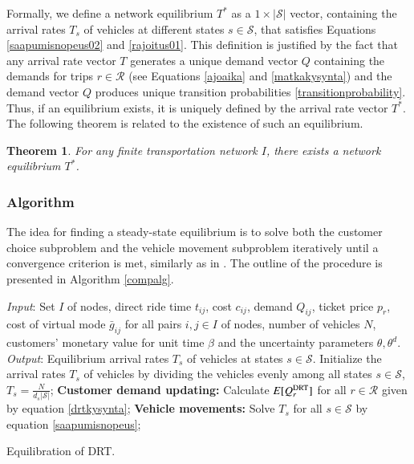 \documentclass[dissertation,draft*]{aaltoseries}
\newtheorem{theorem}{Theorem}
\begin{document}
Formally, we define a network equilibrium $T^*$ as a $1 \times |\mathcal{S}|$ vector, containing the 
arrival rates $T_s$ of vehicles at different states $s \in \mathcal{S}$, that satisfies Equations 
\eqref{saapumisnopeus02} and \eqref{rajoitus01}. This definition is justified by the fact that 
any arrival rate vector $T$ generates a unique demand vector $Q$ containing the demands for trips $r \in \mathcal{R}$ 
(see Equations \eqref{ajoaika} and \eqref{matkakysynta}) and the demand vector
$Q$ produces unique transition probabilities \eqref{transitionprobability}.
Thus, if an equilibrium exists, it is uniquely defined by the arrival rate vector $T^*$.
The following theorem is related to the existence of such an equilibrium.

\begin{theorem}
For any finite transportation network $I$, there exists a network equilibrium $T^*$.
\end{theorem}


\subsubsection{Algorithm}
\label{ratkaisu01}
The idea for finding a steady-state equilibrium is to solve 
both the customer choice subproblem and the vehicle movement subproblem iteratively 
until a convergence criterion is met, similarly as in \citep{yang2010}. 
The outline of the procedure is presented in Algorithm \ref{compalg}.

\begin{algorithm}[H]
\begin{algorithmic}
\STATE \emph{Input}: Set $I$ of nodes, direct ride time $t_{ij}$, cost $c_{ij}$, demand $Q_{ij}$,
ticket price $p_{r}$, cost of virtual mode $\bar{g}_{ij}$ 
for all pairs $i,j \in I$ of nodes, number of vehicles $N$, 
customers' monetary value for unit time $\beta$
and the uncertainty parameters $\theta,\theta^d$.
\STATE \emph{Output}: Equilibrium arrival rates $T_s$ of 
vehicles at states $s \in \mathcal{S}$.
\STATE Initialize the arrival rates $T_s$ of vehicles by dividing the vehicles
evenly among all states $s \in \mathcal{S}$, $T_{s} = \frac {N}{d_s |\mathcal{S}|}$; 
\REPEAT
\STATE \textbf{Customer demand updating:} Calculate $E[Q_{r}^{\rm DRT}]$ for all 
$r \in \mathcal{R}$ given by equation \eqref{drtkysynta};
\STATE \textbf{Vehicle movements:} Solve $T_s$ for all $s \in \mathcal{S}$ by equation \eqref{saapumisnopeus};
\end{algorithmic}
\caption{Equilibration of DRT.}
\label{compalg}
\end{algorithm}
\end{document}
